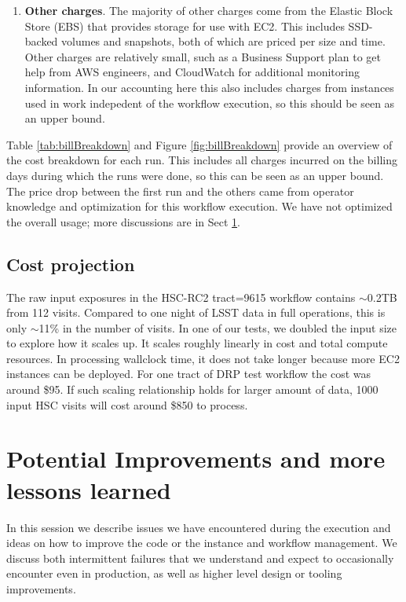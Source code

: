 \begin{enumerate}
\item \textbf{Other charges}.
The majority of other charges come from the Elastic Block Store (EBS) that provides storage for use with EC2.
This includes SSD-backed volumes and snapshots, both of which are priced per size and time.
Other charges are relatively small, such as a Business Support plan to get help from AWS engineers, and CloudWatch for additional monitoring information.
In our accounting here this also includes charges from instances used in work indepedent of the workflow execution, so this should be seen as an upper bound.

\end{enumerate}

Table \ref{tab:billBreakdown} and Figure \ref{fig:billBreakdown} provide an overview of the cost breakdown for each run.
This includes all charges incurred on the billing days during which the runs were done, so this can be seen as an upper bound.
The price drop between the first run and the others came from operator knowledge and optimization for this workflow execution.
We have not optimized the overall usage; more discussions are in Sect \ref{future}.



\subsection{Cost projection}

The raw input exposures in the HSC-RC2 tract=9615 workflow contains $\sim$0.2TB from 112 visits.
Compared to one night of LSST data in full operations, this is only $\sim$11\% in the number of visits.
In one of our tests, we doubled the input size to explore how it scales up.
It scales roughly linearly in cost and total compute resources.
In processing wallclock time, it does not take longer because more EC2 instances can be deployed.
For one tract of DRP test workflow the cost was around \$95.
If such scaling relationship holds for larger amount of data, 1000 input HSC visits will cost around \$850 to process.


\section{Potential Improvements and more lessons learned} \label{future}

In this session we describe issues we have encountered during the execution and ideas on how to improve the code or the instance and workflow management.
We discuss both intermittent failures that we understand and expect to occasionally encounter even in production, as well as higher level design or tooling improvements.

